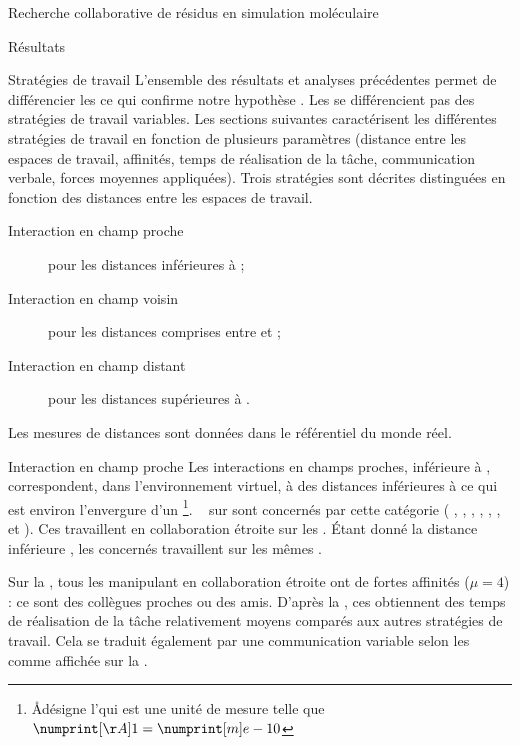 \documentclass[myfrancais]{mythesis}
\begin{document}
\begin{mychapter}{Recherche collaborative de résidus en simulation moléculaire}
\begin{mysection}{Résultats}
\begin{mysubsection}{Stratégies de travail}
				L'ensemble des résultats et analyses précédentes permet de différencier les  ce qui confirme notre hypothèse .
				Les  se différencient pas des stratégies de travail variables.
				Les sections suivantes caractérisent les différentes stratégies de travail en fonction de plusieurs paramètres (distance entre les espaces de travail, affinités, temps de réalisation de la tâche, communication verbale, forces moyennes appliquées).
				Trois stratégies sont décrites distinguées en fonction des distances entre les espaces de travail.
				\begin{description}
					\item[Interaction en champ proche] pour les distances inférieures à ;
					\item[Interaction en champ voisin] pour les distances comprises entre  et ;
					\item[Interaction en champ distant] pour les distances supérieures à .
				\end{description}
				Les mesures de distances sont données dans le référentiel du monde réel.
				\begin{mysubsubsection}{Interaction en champ proche}
					Les interactions en champs proches, inférieure à , correspondent, dans l'environnement virtuel, à des distances inférieures à  ce qui est environ l'envergure d'un \footnote{\og \AA \fg désigne l'\myangstrom qui est une unité de mesure telle que $\mynum[\AA]{1} = \mynum[m]{e-10}$}.
					~ sur  sont concernés par cette catégorie ( , , , , , ,  et ).
					Ces  travaillent en collaboration étroite sur les .
					Étant donné la distance inférieure , les  concernés travaillent sur les mêmes .

					Sur la , tous les  manipulant en collaboration étroite ont de fortes affinités ($\mu = 4$) : ce sont des collègues proches ou des amis.
					D'après la , ces  obtiennent des temps de réalisation de la tâche relativement moyens comparés aux autres stratégies de travail.
					Cela se traduit également par une communication variable selon les  comme affichée sur la .


\end{mysubsubsection}
\end{mysubsection}
\end{mysection}
\end{mychapter}
\end{document}
